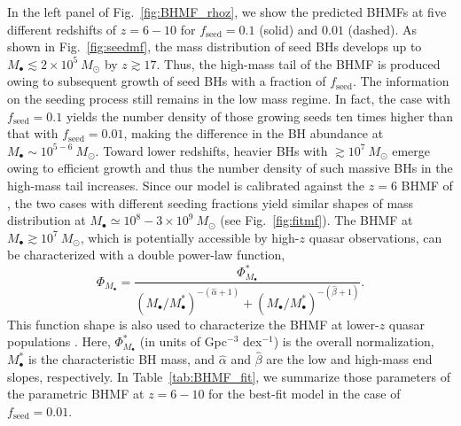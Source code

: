 \documentclass[twocolumn, twocolappendix]{aastex63}
\newcommand{\Msun}{M_\odot}
\newcommand{\fseed}{f_\mathrm{seed}}
\begin{document}
\begin{CJK*}{UTF8}{gbsn}
In the left panel of Fig.~\ref{fig:BHMF_rhoz}, we show the predicted BHMFs at five different redshifts of $z=6-10$
for $\fseed=0.1$ (solid) and $0.01$ (dashed).
As shown in Fig.~\ref{fig:seedmf}, the mass distribution of seed BHs develops up to $M_\bullet \lesssim 2\times10^5~\Msun$ by $z\gtrsim 17$.
Thus, the high-mass tail of the BHMF is produced owing to subsequent growth of seed BHs with a fraction of $\fseed$.
The information on the seeding process still remains in the low mass regime.
In fact, the case with $\fseed=0.1$ yields the number density of those growing seeds ten times higher than that with $\fseed =0.01$,
making the difference in the BH abundance at $M_\bullet \sim 10^{5-6}~\Msun$.
Toward lower redshifts, heavier BHs with $\gtrsim 10^7~\Msun$ emerge owing to efficient growth
and thus the number density of such massive BHs in the high-mass tail increases.
Since our model is calibrated against the $z=6$ BHMF of ,
the two cases with different seeding fractions yield similar shapes of mass distribution at $M_\bullet \simeq 10^8-3\times 10^9~\Msun$ (see Fig.~\ref{fig:fitmf}).
The BHMF at $M_\bullet \gtrsim 10^7~\Msun$, which is potentially accessible by high-$z$ quasar observations,
can be characterized with a double power-law function, 
%
\begin{equation}
\Phi_{M_\bullet}=\frac{\Phi_{M_\bullet}^\ast}{(M_\bullet/M_{\bullet}^\ast)^{-(\hat \alpha+1)} + (M_\bullet/M_{\bullet}^\ast)^{-(\hat \beta+1)}}.
\end{equation}
%
This function shape is also used to characterize the BHMF at lower-$z$ quasar populations
\citep[e.g.,][]{2013ApJ...764...45K,2015MNRAS.447.2085S}.
Here, $\Phi_{M_\bullet}^\ast$ (in units of Gpc$^{-3}$ dex$^{-1}$) is the overall normalization, $M_\bullet^\ast$ is the characteristic BH mass,
and $\hat \alpha$ and $\hat \beta$ are the low and high-mass end slopes, respectively.
In Table~\ref{tab:BHMF_fit}, we summarize those parameters of the parametric BHMF at $z=6-10$ for the best-fit model in the case of $\fseed=0.01$.
%





\end{CJK*}
\end{document}
